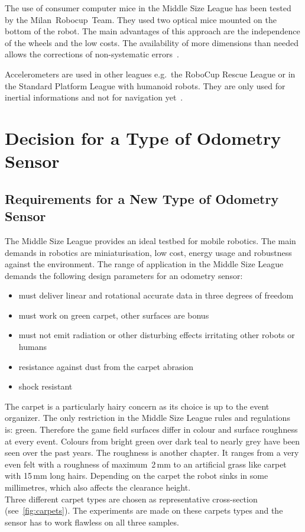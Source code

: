 \documentclass[12pt,a4paper]{article}
\newcommand{\MSL}{Middle Size League\xspace}
\begin{document}
The use of consumer computer mice in the \MSL has been tested by the Milan~Robocup~Team.
They used two optical mice mounted on the bottom of the robot.
The main advantages of this approach are the independence of the wheels and the low costs.
The availability of more dimensions than needed allows the corrections of non-systematic errors~\cite{two_mice}.

Accelerometers are used in other leagues e.g.\ the RoboCup Rescue League or in the Standard Platform League with humanoid robots.
They are only used for inertial informations and not for navigation yet~\cite{zadeat}.

\clearpage
\section{Decision for a Type of Odometry Sensor}
\label{decision}


\subsection{Requirements for a New Type of Odometry Sensor}
\label{requirements}

The \MSL provides an ideal testbed for mobile robotics.
The main demands in robotics are miniaturisation, low cost, energy usage and robustness against the environment.
The range of application in the \MSL demands the following design parameters for an odometry sensor: 
\begin{itemize}
  \item must deliver linear and rotational accurate data in three degrees of freedom
  \item must work on green carpet, other surfaces are bonus
  \item must not emit radiation or other disturbing effects irritating other robots or humans
  \item resistance against dust from the carpet abrasion
  \item shock resistant
\end{itemize}

The carpet is a particularly hairy concern as its choice is up to the event organizer.
The only restriction in the \MSL rules and regulations~\cite{msl-rules} is: green.
Therefore the game field surfaces differ in colour and surface roughness at every event.
Colours from bright green over dark teal to nearly grey have been seen over the past years.
The roughness is another chapter.
It ranges from a very even felt with a roughness of maximum~2\,mm to an artificial grass like carpet with 15\,mm long hairs. 
Depending on the carpet the robot sinks in some millimetres, which also affects the clearance height.\\
Three different carpet types are chosen as representative cross-section (see~\autoref{fig:carpets}).
The experiments are made on these carpets types and the sensor has to work flawless on all three samples.
\end{document}
